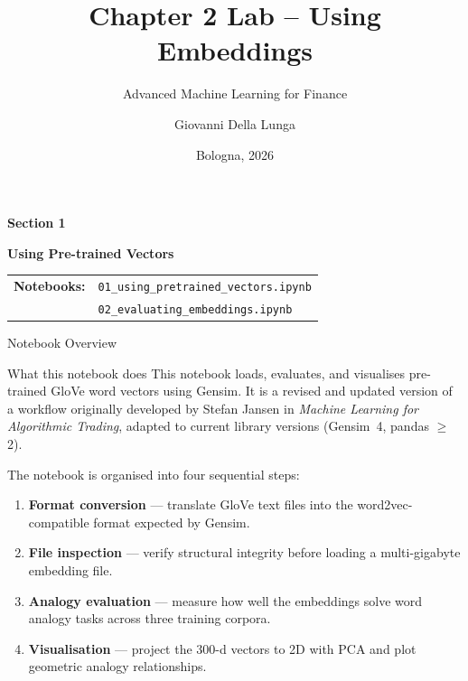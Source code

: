 \documentclass[11pt,aspectratio=169,professionalfonts]{beamer}
\title[Notebook: Pre-trained Word Vectors]{Chapter 2 Lab -- Using Embeddings}
\subtitle{Advanced Machine Learning for Finance}
\author[Giovanni Della Lunga]{Giovanni Della Lunga}
\institute[University of Bologna]{
  Master's Degree in Quantitative Finance\\
  University of Bologna
}
\date{Bologna, 2026}
\begin{document}
\begin{frame}
  \titlepage
\end{frame}
%
\begin{frame}[plain]
\centering
\vspace{1.0cm}
\LARGE{\textbf{Section 1}}
\vspace{0.5cm}

{\Huge \textbf{Using Pre-trained Vectors}}

\vspace{1.5cm}

{\large
\begin{tabular}{@{}l l@{}}
\textbf{Notebooks:} 
& \texttt{01\_using\_pretrained\_vectors.ipynb} \\[0.3em]
& \texttt{02\_evaluating\_embeddings.ipynb}
\end{tabular}
}

\end{frame}
%
\begin{frame}{Notebook Overview}
\small
\begin{block}{What this notebook does}
  This notebook loads, evaluates, and visualises pre-trained GloVe word
  vectors using Gensim. It is a revised and updated version of a workflow
  originally developed by Stefan Jansen in \emph{Machine Learning for
  Algorithmic Trading}, adapted to current library versions (Gensim~4,
  pandas $\geq$2).
\end{block}

\medskip
The notebook is organised into four sequential steps:

\begin{enumerate}
  \item \textbf{Format conversion} — translate GloVe text files into
        the word2vec-compatible format expected by Gensim.
  \item \textbf{File inspection} — verify structural integrity before
        loading a multi-gigabyte embedding file.
  \item \textbf{Analogy evaluation} — measure how well the embeddings
        solve word analogy tasks across three training corpora.
  \item \textbf{Visualisation} — project the 300-d vectors to 2D with
        PCA and plot geometric analogy relationships.
\end{enumerate}
\end{frame}
%
\end{document}
